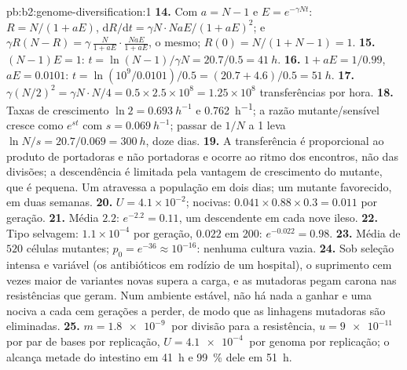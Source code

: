 \begin{solution}{pb:b2:genome-diversification:1}
\textbf{14.} Com $a = N - 1$ e $E = e^{-\gamma Nt}$: $R = N/(1 +
aE)$, $\mathrm{d}R/\mathrm{d}t = \gamma N\cdot NaE/(1 + aE)^2$; e
$\gamma R(N - R) = \gamma\,\frac{N}{1 + aE}\cdot\frac{NaE}{1 + aE}$,
o mesmo; $R(0) = N/(1 + N - 1) = 1$.
\textbf{15.} $(N - 1)E = 1$: $t = \ln(N - 1)/\gamma N = 20.7/0.5 =
\qty{41}{h}$.
\textbf{16.} $1 + aE = 1/0.99$, $aE = 0.0101$: $t = \ln(10^{9}/0.0101)
/0.5 = (20.7 + 4.6)/0.5 = \qty{51}{h}$.
\textbf{17.} $\gamma (N/2)^2 = \gamma N\cdot N/4 = 0.5\times 2.5\times
10^{8} = 1.25\times 10^{8}$ transferências por hora.
\textbf{18.} Taxas de crescimento $\ln 2 = \qty{0.693}{h^{-1}}$ e
\qty{0.762}{h^{-1}}; a razão mutante/sensível cresce como $e^{st}$
com $s = \qty{0.069}{h^{-1}}$; passar de $1/N$ a 1 leva $\ln N/s =
20.7/0.069 = \qty{300}{h}$, doze dias.
\textbf{19.} A transferência é proporcional ao produto de portadoras e
não portadoras e ocorre ao ritmo dos encontros, não das divisões; a
descendência é limitada pela vantagem de crescimento do mutante, que é
pequena. Um  atravessa a população em dois dias; um mutante
favorecido, em duas semanas.
\textbf{20.} $U = 4.1\times 10^{-2}$; nocivas: $0.041\times 0.88\times
0.3 = 0.011$ por geração.
\textbf{21.} Média $2.2$: $e^{-2.2} = 0.11$, um descendente em cada
nove ileso.
\textbf{22.} Tipo selvagem: $1.1\times 10^{-4}$ por geração, $0.022$
em 200: $e^{-0.022} = 0.98$.
\textbf{23.} Média de $520$ células mutantes; $p_0 = e^{-36} \approx
10^{-16}$: nenhuma cultura vazia.
\textbf{24.} Sob seleção intensa e variável (os antibióticos em
rodízio de um hospital), o suprimento cem vezes maior de variantes
novas supera a carga, e as mutadoras pegam carona nas resistências que
geram. Num ambiente estável, não há nada a ganhar e uma  nociva
a cada cem gerações a perder, de modo que as linhagens mutadoras são
eliminadas.
\textbf{25.} $m = \qty{1.8e-9}{}$ por divisão para a resistência, $u =
\qty{9e-11}{}$ por par de bases por replicação,
$U = \qty{4.1e-4}{}$  por genoma por replicação; o 
alcança metade do intestino em \qty{41}{h} e \qty{99}{\%} dele em
\qty{51}{h}.
\end{solution}
